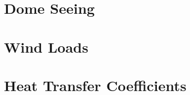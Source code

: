 \documentclass{gmto-book}
\begin{document}


\part{Dome Seeing}
\label{dome-seeing}





\part{Wind Loads}
\label{wind-loads}





\part{Heat Transfer Coefficients}
\label{htc}






\printbibliography
\end{document}
